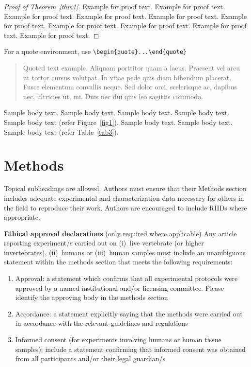 \documentclass{article}
\begin{document}
\begin{proof}[Proof of Theorem~{\upshape\ref{thm1}}]
Example for proof text. Example for proof text. Example for proof text. Example for proof text. Example for proof text. Example for proof text. Example for proof text. Example for proof text. Example for proof text. Example for proof text. 
\end{proof}

\noindent
For a quote environment, use \verb+\begin{quote}...\end{quote}+
\begin{quote}
Quoted text example. Aliquam porttitor quam a lacus. Praesent vel arcu ut tortor cursus volutpat. In vitae pede quis diam bibendum placerat. Fusce elementum
convallis neque. Sed dolor orci, scelerisque ac, dapibus nec, ultricies ut, mi. Duis nec dui quis leo sagittis commodo.
\end{quote}

Sample body text. Sample body text. Sample body text. Sample body text. Sample body text (refer Figure~\ref{fig1}). Sample body text. Sample body text. Sample body text (refer Table~\ref{tab3}). 

\section{Methods}\label{sec11}

Topical subheadings are allowed. Authors must ensure that their Methods section includes adequate experimental and characterization data necessary for others in the field to reproduce their work. Authors are encouraged to include RIIDs where appropriate. 

\textbf{Ethical approval declarations} (only required where applicable) Any article reporting experiment/s carried out on (i)~live vertebrate (or higher invertebrates), (ii)~humans or (iii)~human samples must include an unambiguous statement within the methods section that meets the following requirements: 

\begin{enumerate}[1.]
\item Approval: a statement which confirms that all experimental protocols were approved by a named institutional and/or licensing committee. Please identify the approving body in the methods section

\item Accordance: a statement explicitly saying that the methods were carried out in accordance with the relevant guidelines and regulations

\item Informed consent (for experiments involving humans or human tissue samples): include a statement confirming that informed consent was obtained from all participants and/or their legal guardian/s
\end{enumerate}
\end{document}
